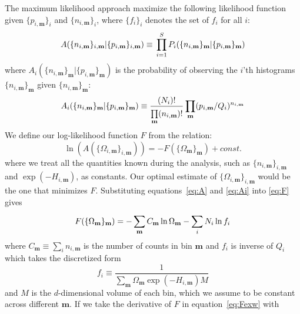 The maximum likelihood approach maximize the following likelihood function given 
$\{p_{i,\mathbf{m}}\}_i$ and $\{n_{i,\mathbf{m}}\}_i$, where $\{f_i\}_i$ denotes the set 
of $f_i$ for all $i$:
\begin{equation}
A(\{n_{i,\mathbf{m}}\}_{i,\mathbf{m}} | \{p_{i,\mathbf{m}}\}_{i,\mathbf{m}}) \equiv \\
\prod_{i=1}^{S} P_{i}(\{n_{i,\mathbf{m}}\}_{\mathbf{m}} | \{p_{i,\mathbf{m}}\}_{\mathbf{m}})
\label{eq:A}
\end{equation}
where $A_{i}(\{n_{i,\mathbf{m}}\}_{\mathbf{m}} | \{p_{i,\mathbf{m}}\}_{\mathbf{m}})$ 
is the probability of observing the $i$'th histograms $\{n_{i,\mathbf{m}}\}_{\mathbf{m}}$ 
given $\{n_{i,\mathbf{m}}\}_{\mathbf{m}}$:
\begin{equation}
A_{i}(\{n_{i,\mathbf{m}}\}_{\mathbf{m}} | \{p_{i,\mathbf{m}}\}_{\mathbf{m}}) \equiv \\
\frac{(N_i)!}{\prod\limits_{\mathbf{m}}^{} (n_{i,\mathbf{m}})!} \\
\prod\limits_{\mathbf{m}}^{} (p_{i,\mathbf{m}}/Q_{i})^{n_{i,\mathbf{m}}}
\label{eq:Ai}
\end{equation}
We define our log-likelihood function $F$ from the relation:
\begin{equation}
\ln(A(\{\Omega_{i,\mathbf{m}}\}_{i,\mathbf{m}})) = - F(\{\Omega_{\mathbf{m}}\}_{\mathbf{m}}) + const.
\label{eq:F}
\end{equation}
where we treat all the quantities known during the analysis, such as 
$\{n_{i,\mathbf{m}}\}_{i,\mathbf{m}}$ and $\exp(-H_{i,\mathbf{m}})$, as constants.
Our optimal estimate of $\{\Omega_{i,\mathbf{m}}\}_{i,\mathbf{m}}$ would be the one 
that minimizes $F$. Substituting equations~\ref{eq:A} and \ref{eq:Ai} into \ref{eq:F} 
gives 
\begin{equation}
F(\{\Omega_{\mathbf{m}}\}_{\mathbf{m}}) = -\sum_{\mathbf{m}}^{} C_{\mathbf{m}} \ln \Omega_{\mathbf{m}} \\
- \sum_{i}^{} N_i \ln f_{i}
\label{eq:Fexw}
\end{equation}
where $C_{\mathbf{m}} \equiv \sum\limits_{i}^{} n_{i,\mathbf{m}}$ is the number of counts
in bin $\mathbf{m}$ and $f_{i}$ is inverse of $Q_{i}$ which takes the discretized form
\begin{equation}
f_{i} \equiv \frac{1}{\sum_{\mathbf{m}}^{} \Omega_{\mathbf{m}} \exp(-H_{i,\mathbf{m}}) M}
\end{equation}
and $M$ is the $d$-dimensional volume of each bin, which we assume to be constant across 
different $\mathbf{m}$. If we take the derivative of $F$ in equation~\ref{eq:Fexw} with
